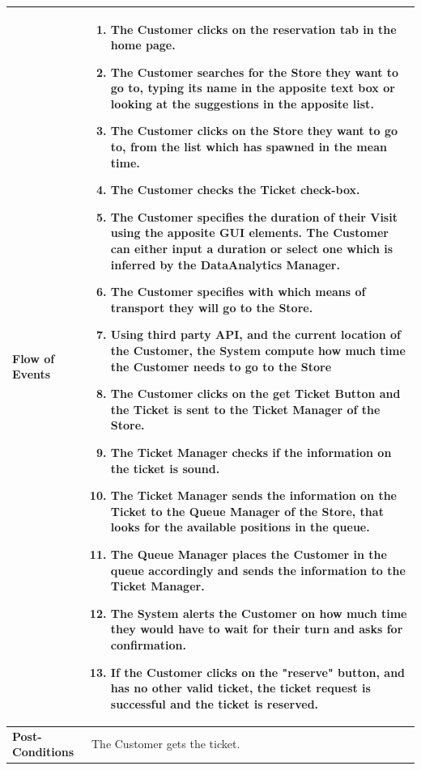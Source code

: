 \documentclass[a4paper, 10pt, oneside]{article}
\begin{document}
\begin{tabularx}{\linewidth}{| l | X |}
	\hline
	\textbf{Flow of Events} & \parbox{0.7\textwidth}{	
		\begin{enumerate}
		    \item The Customer clicks on the reservation tab in the home page.
			\item The Customer searches for the Store they want to go to, typing its name in the apposite text box or looking at the suggestions in the apposite list.
			\item The Customer clicks on the Store they want to go to, from the list which has spawned in the mean time.
			\item The Customer checks the Ticket check-box.
			\item The Customer specifies the duration of their Visit using the apposite GUI elements. The Customer can either input a duration or select one which is inferred by the DataAnalytics Manager.
			\item The Customer specifies with which means of transport they will go to the Store.
			\item Using third party API, and the current location of the Customer, the System compute how much time the Customer needs to go to the Store
			\item The Customer clicks on the get Ticket Button and the Ticket is sent to the Ticket Manager of the Store.
			\item The Ticket Manager checks if the information on the ticket is sound.
			\item The Ticket Manager sends the information on the Ticket to the Queue Manager of the Store, that looks for the available positions in the queue.
			\item The Queue Manager places the Customer in the queue accordingly and sends the information to the Ticket Manager.
			\item The System alerts the Customer on how much time they would have to wait for their turn and asks for confirmation.
			\item If the Customer clicks on the "reserve" button, and has no other valid ticket, the ticket request is successful and the ticket is reserved.
	\end{enumerate}}\\
	
	\hline
	\textbf{Post-Conditions} & The Customer gets the ticket.\\
	

\end{tabularx}
\end{document}
